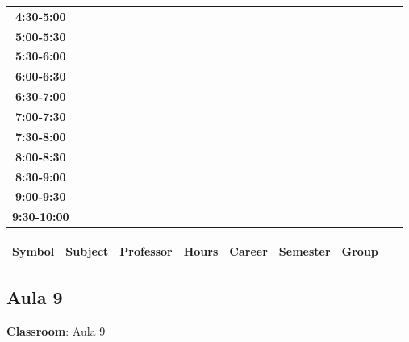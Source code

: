 \documentclass{article}
\begin{document}
\begin{table}[ht]
\begin{tabular}{|c|c|c|c|c|c|c|c|c|c|c|c|c|c|c|c|c|c|c|c|c|c|c|c|c|c|c|c|c|c|}
 \cline{1-8} 
\textbf{4:30-5:00} &   &   &   &   &   &   &   \\
 \cline{1-8} 
\textbf{5:00-5:30} &   &   &   &   &   &   &   \\
 \cline{1-8} 
\textbf{5:30-6:00} &   &   &   &   &   &   &   \\
 \cline{1-8} 
\textbf{6:00-6:30} &   &   &   &   &   &   &   \\
 \cline{1-8} 
\textbf{6:30-7:00} &   &   &   &   &   &   &   \\
 \cline{1-8} 
\textbf{7:00-7:30} &   &   &   &   &   &   &   \\
 \cline{1-8} 
\textbf{7:30-8:00} &   &   &   &   &   &   &   \\
 \cline{1-8} 
\textbf{8:00-8:30} &   &   &   &   &   &   &   \\
 \cline{1-8} 
\textbf{8:30-9:00} &   &   &   &   &   &   &   \\
 \cline{1-8} 
\textbf{9:00-9:30} &   &   &   &   &   &   &   \\
 \cline{1-8} 
\textbf{9:30-10:00} &   &   &   &   &   &   &   \\
 \cline{1-8} 
\end{tabular}\end{table}

        
        \begin{tabular}{|>{\centering\arraybackslash}m{2cm}|>{\centering\arraybackslash}m{4cm}|>{\centering\arraybackslash}m{2.15cm}|>{\centering\arraybackslash}m{1.8cm}|>{\centering\arraybackslash}m{2cm}|>{\centering\arraybackslash}m{2cm}|>{\centering\arraybackslash}m{2cm}|}
        \hline
        \textbf{Symbol} & \textbf{Subject} & \textbf{Professor} & \textbf{Hours} & \textbf{Career} & \textbf{Semester} & \textbf{Group} \\
        \hline
        \end{tabular}
                    

        \newpage
        

        \subsection{Aula 9}
        \vspace*{.1cm}
        
        \begin{flushright}
            {\LARGE \textbf{Classroom}: Aula 9}
        \end{flushright}
        \vspace{1cm}
\end{document}
